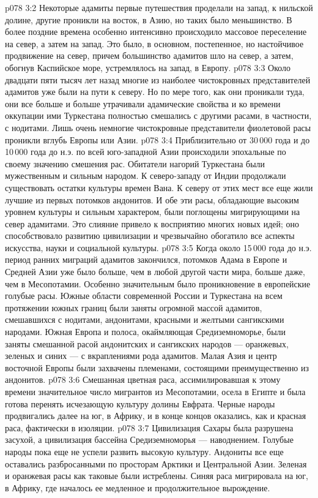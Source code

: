 \vs p078 3:2 Некоторые адамиты первые путешествия проделали на запад, к нильской долине, другие проникли на восток, в Азию, но таких было меньшинство. В более поздние времена особенно интенсивно происходило массовое переселение на север, а затем на запад. Это было, в основном, постепенное, но настойчивое продвижение на север, причем большинство адамитов шло на север, а затем, обогнув Каспийское море, устремлялось на запад, в Европу.
\vs p078 3:3 Около двадцати пяти тысяч лет назад многие из наиболее чистокровных представителей адамитов уже были на пути к северу. Но по мере того, как они проникали туда, они все больше и больше утрачивали адамические свойства и ко времени оккупации ими Туркестана полностью смешались с другими расами, в частности, с нодитами. Лишь очень немногие чистокровные представители фиолетовой расы проникли вглубь Европы или Азии.
\vs p078 3:4 Приблизительно от 30\,000 года и до 10\,000 года до н.э. по всей юго\hyp{}западной Азии происходили эпохальные по своему значению смешения рас. Обитатели нагорий Туркестана были мужественным и сильным народом. К северо\hyp{}западу от Индии продолжали существовать остатки культуры времен Вана. К северу от этих мест все еще жили лучшие из первых потомков андонитов. И обе эти расы, обладающие высоким уровнем культуры и сильным характером, были поглощены мигрирующими на север адамитами. Это слияние привело к восприятию многих новых идей; оно способствовало развитию цивилизации и чрезвычайно обогатило все аспекты искусства, науки и социальной культуры.
\vs p078 3:5 \pc Когда около 15\,000 года до н.э. период ранних миграций адамитов закончился, потомков Адама в Европе и Средней Азии уже было больше, чем в любой другой части мира, больше даже, чем в Месопотамии. Особенно значительным было проникновение в европейские голубые расы. Южные области современной России и Туркестана на всем протяжении южных границ были заняты огромной массой адамитов, смешавшихся с нодитами, андонитами, красными и желтыми сангикскими народами. Южная Европа и полоса, окаймляющая Средиземноморье, были заняты смешанной расой андонитских и сангикских народов --- оранжевых, зеленых и синих --- с вкраплениями рода адамитов. Малая Азия и центр восточной Европы были захвачены племенами, состоящими преимущественно из андонитов.
\vs p078 3:6 Смешанная цветная раса, ассимилировавшая к этому времени значительное число мигрантов из Месопотамии, осела в Египте и была готова перенять исчезающую культуру долины Евфрата. Черные народы продвигались далее на юг, в Африку, и в конце концов оказались, как и красная раса, фактически в изоляции.
\vs p078 3:7 Цивилизация Сахары была разрушена засухой, а цивилизация бассейна Средиземноморья --- наводнением. Голубые народы пока еще не успели развить высокую культуру. Андониты все еще оставались разбросанными по просторам Арктики и Центральной Азии. Зеленая и оранжевая расы как таковые были истреблены. Синяя раса мигрировала на юг, в Африку, где началось ее медленное и продолжительное вырождение.
